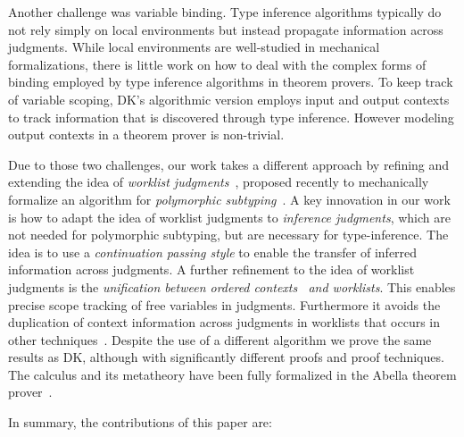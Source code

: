 Another challenge was variable binding. Type inference algorithms
typically do not rely simply on local environments but instead
propagate information across judgments. While local environments are
well-studied in mechanical formalizations, there is little work on how
to deal with the complex forms of binding employed by type inference algorithms
in theorem provers. To
keep track of variable scoping, DK's algorithmic version employs input
and output contexts to track information that is discovered through
type inference. However modeling output contexts in a theorem prover
is non-trivial.

Due to those two challenges, our work takes a different approach by refining and
extending the idea of \emph{worklist judgments}~\cite{itp2018},
proposed recently to mechanically formalize an algorithm for
\emph{polymorphic subtyping}~\cite{odersky1996putting}. A key innovation in our work is how
to adapt the idea of worklist judgments to
\emph{inference judgments}, which are not needed for polymorphic
subtyping, but are necessary for type-inference.  The idea is to use a \emph{continuation
passing style} to enable the transfer of inferred information across
judgments. A further refinement to the idea of worklist judgments is
the \emph{unification between ordered
  contexts~\cite{gundry2010type,dunfield2013complete} and worklists}.  This
enables precise scope tracking of free variables in
judgments. Furthermore it avoids the duplication of context
information across judgments in worklists that occurs in other
techniques~\cite{Reed2009,Abel2011higher}.
Despite the use of a different algorithm we prove the
same results as DK, although with significantly different proofs and
proof techniques. The calculus and its metatheory
have been fully formalized in the Abella theorem prover~\cite{AbellaDesc}.

In summary, the contributions of this paper are:

